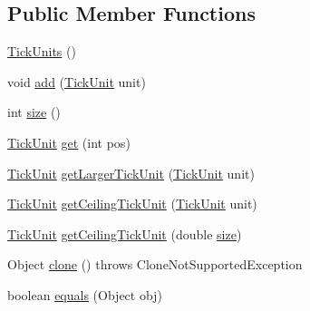 \subsection*{Public Member Functions}
\begin{DoxyCompactItemize}
\item 
\mbox{\hyperlink{classorg_1_1jfree_1_1chart_1_1axis_1_1_tick_units_ad84724a61635ad62f45065f7969f3d23}{Tick\+Units}} ()
\item 
void \mbox{\hyperlink{classorg_1_1jfree_1_1chart_1_1axis_1_1_tick_units_a61de767ebfb2115a7e374cc70f5901f5}{add}} (\mbox{\hyperlink{classorg_1_1jfree_1_1chart_1_1axis_1_1_tick_unit}{Tick\+Unit}} unit)
\item 
int \mbox{\hyperlink{classorg_1_1jfree_1_1chart_1_1axis_1_1_tick_units_ac00d61ce729a587f941063cf4213b1d9}{size}} ()
\item 
\mbox{\hyperlink{classorg_1_1jfree_1_1chart_1_1axis_1_1_tick_unit}{Tick\+Unit}} \mbox{\hyperlink{classorg_1_1jfree_1_1chart_1_1axis_1_1_tick_units_a3199d72d88c387fc35b85dc8d70f780a}{get}} (int pos)
\item 
\mbox{\hyperlink{classorg_1_1jfree_1_1chart_1_1axis_1_1_tick_unit}{Tick\+Unit}} \mbox{\hyperlink{classorg_1_1jfree_1_1chart_1_1axis_1_1_tick_units_a4f4719e1bb4772648808c0d00787a92d}{get\+Larger\+Tick\+Unit}} (\mbox{\hyperlink{classorg_1_1jfree_1_1chart_1_1axis_1_1_tick_unit}{Tick\+Unit}} unit)
\item 
\mbox{\hyperlink{classorg_1_1jfree_1_1chart_1_1axis_1_1_tick_unit}{Tick\+Unit}} \mbox{\hyperlink{classorg_1_1jfree_1_1chart_1_1axis_1_1_tick_units_a925a94d152ae23f36f676bd9a0dee5e3}{get\+Ceiling\+Tick\+Unit}} (\mbox{\hyperlink{classorg_1_1jfree_1_1chart_1_1axis_1_1_tick_unit}{Tick\+Unit}} unit)
\item 
\mbox{\hyperlink{classorg_1_1jfree_1_1chart_1_1axis_1_1_tick_unit}{Tick\+Unit}} \mbox{\hyperlink{classorg_1_1jfree_1_1chart_1_1axis_1_1_tick_units_ac65181d78c8783d8094d8b28273c37da}{get\+Ceiling\+Tick\+Unit}} (double \mbox{\hyperlink{classorg_1_1jfree_1_1chart_1_1axis_1_1_tick_units_ac00d61ce729a587f941063cf4213b1d9}{size}})
\item 
Object \mbox{\hyperlink{classorg_1_1jfree_1_1chart_1_1axis_1_1_tick_units_ac31c970d7e57697a372ccfd97c553bae}{clone}} ()  throws Clone\+Not\+Supported\+Exception 
\item 
boolean \mbox{\hyperlink{classorg_1_1jfree_1_1chart_1_1axis_1_1_tick_units_a34b1b0e0a0c320f7d9e48dab2e11b9d1}{equals}} (Object obj)
\end{DoxyCompactItemize}


